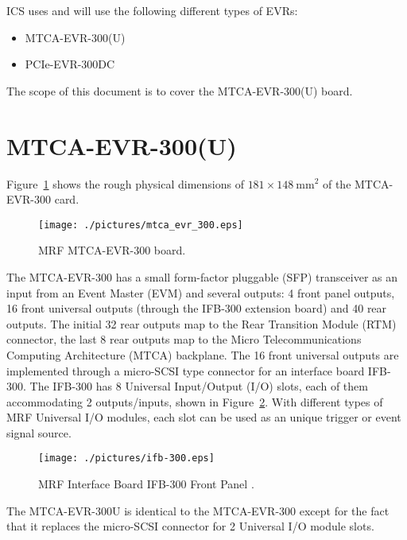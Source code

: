 \documentclass[11pt
  , a4paper
  , article
  , oneside
  , showtrims
]{memoir}
\begin{document}
ICS uses and will use the following different types of EVRs:
\begin{itemize}
\item MTCA-EVR-300(U)
\item PCIe-EVR-300DC
\end{itemize}

The scope of this document is to cover the MTCA-EVR-300(U) board.\\


\section{MTCA-EVR-300(U)}
Figure~\ref{fig:mtca-evr300} shows the rough physical dimensions of $181\times 148~\mathrm{mm}{}^2$ of the MTCA-EVR-300 card.

\begin{figure}[!htb]
  \centering
  \texttt{[image: ./pictures/mtca\_evr\_300.eps]}
  \caption{
    MRF MTCA-EVR-300 board.
  }
  \label{fig:mtca-evr300}
\end{figure}


The MTCA-EVR-300 has a small form-factor pluggable (SFP) transceiver as an input from an Event Master (EVM) and several outputs: 4 front panel outputs, 16 front universal outputs (through the IFB-300 extension board) and 40 rear outputs. The initial 32 rear outputs map to the Rear Transition Module (RTM) connector, the last 8 rear outputs map to the Micro Telecommunications Computing Architecture (MTCA) backplane. The 16 front universal outputs are implemented through a micro-SCSI type connector for an interface board IFB-300. The IFB-300 has 8 Universal Input/Output (I/O) slots, each of them accommodating 2 outputs/inputs, shown in Figure~\ref{fig:ifb-300}. With different types of MRF Universal I/O modules, each slot can be used as an unique trigger or event signal source.\\

\begin{figure}[!htb]
  \centering
  \texttt{[image: ./pictures/ifb-300.eps]}
  \caption{
    MRF Interface Board IFB-300 Front Panel \cite{MRFEVENTSYSTEMDC}.
  }
  \label{fig:ifb-300}
\end{figure}

The MTCA-EVR-300U is identical to the MTCA-EVR-300 except for the fact that it replaces the micro-SCSI connector for 2 Universal I/O module slots.\\
\end{document}
